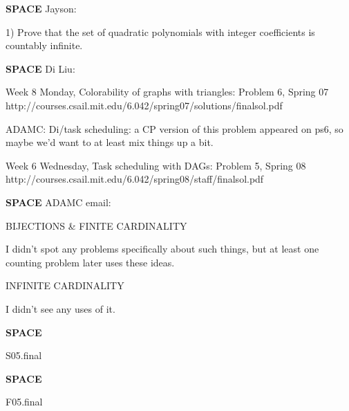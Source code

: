\documentclass[quiz]{mcs}
\renewcommand{\examspace}{\textbf{SPACE}}
\begin{document}

\examspace
Jayson:

1) Prove that the set of quadratic polynomials with integer
coefficients is countably infinite.

\examspace
Di Liu:

Week 8 Monday, Colorability of graphs with triangles: Problem 6, Spring 07
http://courses.csail.mit.edu/6.042/spring07/solutions/finalsol.pdf

ADAMC: Di/task scheduling: a CP version of this problem appeared on
ps6, so maybe we'd want to at least mix things up a bit.

Week 6 Wednesday, Task scheduling with DAGs: Problem 5, Spring 08
http://courses.csail.mit.edu/6.042/spring08/staff/finalsol.pdf

\examspace
ADAMC email:

BIJECTIONS \& FINITE CARDINALITY

I didn't spot any problems specifically about such things, but at
least one counting problem later uses these ideas.

INFINITE CARDINALITY

I didn't see any uses of it.

\examspace
\begin{editingnotes}S05.final\end{editingnotes}



\examspace
\begin{editingnotes}F05.final\end{editingnotes}

\end{document}
